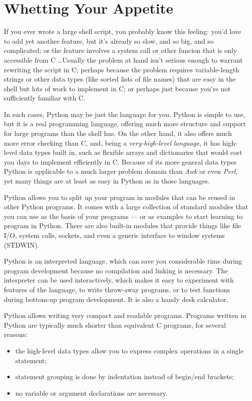 

\chapter{Whetting Your Appetite}

If you ever wrote a large shell script, you probably know this
feeling: you'd love to add yet another feature, but it's already so
slow, and so big, and so complicated; or the feature involves a system
call or other funcion that is only accessible from C \ldots  Usually
the problem at hand isn't serious enough to warrant rewriting the
script in C; perhaps because the problem requires variable-length
strings or other data types (like sorted lists of file names) that are
easy in the shell but lots of work to implement in C; or perhaps just
because you're not sufficiently familiar with C.

In such cases, Python may be just the language for you.  Python is
simple to use, but it is a real programming language, offering much
more structure and support for large programs than the shell has.  On
the other hand, it also offers much more error checking than C, and,
being a {\em very-high-level language}, it has high-level data types
built in, such as flexible arrays and dictionaries that would cost you
days to implement efficiently in C.  Because of its more general data
types Python is applicable to a much larger problem domain than {\em
Awk} or even {\em Perl}, yet many things are at least as easy in
Python as in those languages.

Python allows you to split up your program in modules that can be
reused in other Python programs.  It comes with a large collection of
standard modules that you can use as the basis of your programs --- or
as examples to start learning to program in Python.  There are also
built-in modules that provide things like file I/O, system calls,
sockets, and even a generic interface to window systems (STDWIN).

Python is an interpreted language, which can save you considerable time
during program development because no compilation and linking is
necessary.  The interpreter can be used interactively, which makes it
easy to experiment with features of the language, to write throw-away
programs, or to test functions during bottom-up program development.
It is also a handy desk calculator.

Python allows writing very compact and readable programs.  Programs
written in Python are typically much shorter than equivalent C
programs, for several reasons:
\begin{itemize}
\item
the high-level data types allow you to express complex operations in a
single statement;
\item
statement grouping is done by indentation instead of begin/end
brackets;
\item
no variable or argument declarations are necessary.
\end{itemize}

